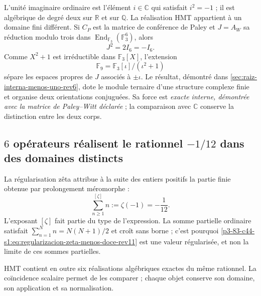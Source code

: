 L'unité imaginaire ordinaire est l'élément
\(i\in\mathbb C\) qui satisfait \(i^2=-1\) ; il est algébrique de degré deux sur
\(\mathbb R\) et sur \(\mathbb Q\). La réalisation HMT appartient à un
domaine fini différent. Si \(C_P\) est la matrice de conférence de Paley et
\(J=A_W\) sa réduction modulo trois dans
\(\operatorname{End}_{\mathbb F_3}(\mathbb F_3^6)\), alors
\begin{equation}
 \boxed{J^2=2I_6=-I_6.}
 \label{p3-83-c44-s1:eq:raiz-interna-menos-uno-ontologia-rev11}
\end{equation}
Comme \(X^2+1\) est irréductible dans \(\mathbb F_3[X]\), l'extension
\[
 \mathbb F_9=\mathbb F_3[\iota]/(\iota^2+1)
\]
sépare les espaces propres de \(J\) associés à \(\pm\iota\). Le résultat,
démontré dans \cref{sec:raiz-interna-menos-uno-rev6}, dote le module ternaire d'une
structure complexe finie et organise deux orientations conjuguées. Sa force
est \emph{exacte interne, démontrée avec la matrice de Paley--Witt déclarée} ; la
comparaison avec \(\mathbb C\) conserve la distinction entre les deux corps.

\subsection{\(6\) opérateurs réalisent le rationnel
\texorpdfstring{\( -1/12 \)}{-1/12} dans des domaines distincts}

La régularisation zêta attribue à la suite des entiers positifs la partie
finie obtenue par prolongement méromorphe :
\begin{equation}
 \sum_{n\geq1}^{[\zeta]}n
 :=\zeta(-1)=-\frac1{12}.
 \label{p3-83-c44-s1:eq:regularizacion-zeta-menos-doce-rev11}
\end{equation}
L'exposant \([\zeta]\) fait partie du type de l'expression. La somme
partielle ordinaire satisfait
\(\sum_{n=1}^{N}n=N(N+1)/2\) et croît sans borne ; c'est pourquoi
\eqref{p3-83-c44-s1:eq:regularizacion-zeta-menos-doce-rev11} est une valeur régularisée, et non
la limite de ces sommes partielles.

HMT contient en outre six réalisations algébriques exactes du même
rationnel. La coïncidence scalaire permet de les comparer ; chaque objet conserve son
domaine, son application et sa normalisation.

